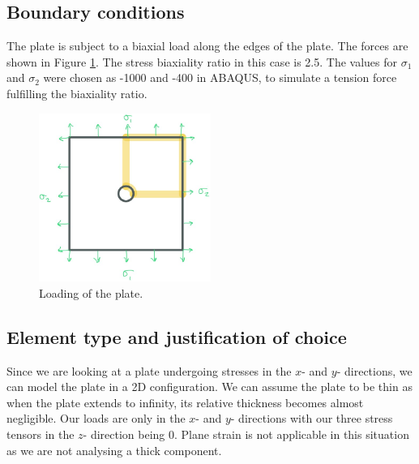 \documentclass[11pt]{article}
\numberwithin{equation}{section}
\begin{document}
\subsection{Boundary conditions}
The plate is subject to a biaxial load along the edges of the plate. The forces are shown in Figure \ref{plateLoading}. The stress biaxiality ratio in this case is 2.5. The values for $\sigma_1$ and $\sigma_2$ were chosen as -1000 and -400 in ABAQUS, to simulate a tension force fulfilling the biaxiality ratio. 
\begin{figure}[H]
    \centering
    \includegraphics[width = 0.5\textwidth]{./img/diagram6.jpg}
    \caption{Loading of the plate.}
    \label{plateLoading}
\end{figure}
\subsection{Element type and justification of choice}
Since we are looking at a plate undergoing stresses in the $x$- and $y$- directions, we can model the plate in a 2D configuration. We can assume the plate to be thin as when the plate extends to infinity, its relative thickness becomes almost negligible. Our loads are only in the $x$- and $y$- directions with our three stress tensors in the $z$- direction being 0. Plane strain is not applicable in this situation as we are not analysing a thick component. 
\end{document}
